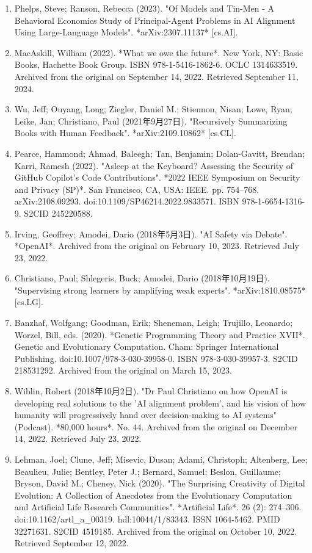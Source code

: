 \begin{enumerate}
\item Phelps, Steve; Ranson, Rebecca (2023). "Of Models and Tin-Men - A Behavioral Economics Study of Principal-Agent Problems in AI Alignment Using Large-Language Models". *arXiv:2307.11137* [cs.AI].
\item MacAskill, William (2022). *What we owe the future*. New York, NY: Basic Books, Hachette Book Group. ISBN 978-1-5416-1862-6. OCLC 1314633519. Archived from the original on September 14, 2022. Retrieved September 11, 2024.
\item Wu, Jeff; Ouyang, Long; Ziegler, Daniel M.; Stiennon, Nisan; Lowe, Ryan; Leike, Jan; Christiano, Paul (2021年9月27日). "Recursively Summarizing Books with Human Feedback". *arXiv:2109.10862* [cs.CL].
\item Pearce, Hammond; Ahmad, Baleegh; Tan, Benjamin; Dolan-Gavitt, Brendan; Karri, Ramesh (2022). "Asleep at the Keyboard? Assessing the Security of GitHub Copilot's Code Contributions". *2022 IEEE Symposium on Security and Privacy (SP)*. San Francisco, CA, USA: IEEE. pp. 754–768. arXiv:2108.09293. doi:10.1109/SP46214.2022.9833571. ISBN 978-1-6654-1316-9. S2CID 245220588.
\item Irving, Geoffrey; Amodei, Dario (2018年5月3日). "AI Safety via Debate". *OpenAI*. Archived from the original on February 10, 2023. Retrieved July 23, 2022.
\item Christiano, Paul; Shlegeris, Buck; Amodei, Dario (2018年10月19日). "Supervising strong learners by amplifying weak experts". *arXiv:1810.08575* [cs.LG].
\item Banzhaf, Wolfgang; Goodman, Erik; Sheneman, Leigh; Trujillo, Leonardo; Worzel, Bill, eds. (2020). *Genetic Programming Theory and Practice XVII*. Genetic and Evolutionary Computation. Cham: Springer International Publishing. doi:10.1007/978-3-030-39958-0. ISBN 978-3-030-39957-3. S2CID 218531292. Archived from the original on March 15, 2023.
\item Wiblin, Robert (2018年10月2日). "Dr Paul Christiano on how OpenAI is developing real solutions to the 'AI alignment problem', and his vision of how humanity will progressively hand over decision-making to AI systems" (Podcast). *80,000 hours*. No. 44. Archived from the original on December 14, 2022. Retrieved July 23, 2022.
\item Lehman, Joel; Clune, Jeff; Misevic, Dusan; Adami, Christoph; Altenberg, Lee; Beaulieu, Julie; Bentley, Peter J.; Bernard, Samuel; Beslon, Guillaume; Bryson, David M.; Cheney, Nick (2020). "The Surprising Creativity of Digital Evolution: A Collection of Anecdotes from the Evolutionary Computation and Artificial Life Research Communities". *Artificial Life*. 26 (2): 274–306. doi:10.1162/artl_a_00319. hdl:10044/1/83343. ISSN 1064-5462. PMID 32271631. S2CID 4519185. Archived from the original on October 10, 2022. Retrieved September 12, 2022.

\end{enumerate}
